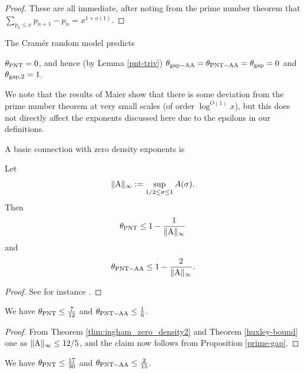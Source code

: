 \begin{proof} These are all immediate, after noting from the prime number theorem that $\sum_{p_n \leq x} p_{n+1} - p_n = x^{1+o(1)}$.
\end{proof}

The Cram\'er random model \cite{cramer} predicts

\begin{conjecture} $\theta_{\mathrm{PNT}} = 0$, and hence (by Lemma \ref{pnt-triv}) $\theta_{\mathrm{gap-AA}} = \theta_{\mathrm{PNT-AA}} = \theta_{\mathrm{gap}}=0$ and $\theta_{\mathrm{gap},2}=1$.
\end{conjecture}

We note that the results of Maier \cite{maier-primes} show that there is some deviation from the prime number theorem at very small scales (of order $\log^{O(1)} x$), but this does not directly affect the exponents discussed here due to the epsilons in our definitions.

A basic connection with zero density exponents is

\begin{proposition}\label{prime-gap}  Let
\begin{equation}\label{A-def}
    \|\mathrm{A}\|_\infty := \sup_{1/2 \leq \sigma \leq 1} A(\sigma).
\end{equation}
Then
    $$ \theta_{\mathrm{PNT}} \leq 1 - \frac{1}{\|\mathrm{A}\|_\infty}$$
    and
    $$ \theta_{\mathrm{PNT-AA}} \leq 1 - \frac{2}{\|\mathrm{A}\|_\infty}.$$
\end{proposition}

\begin{proof} See for instance \cite[\S 13.2]{guth-maynard}.
\end{proof}

\begin{corollary}  We have $\theta_{\mathrm{PNT}} \leq \frac{7}{12}$ and $\theta_{\mathrm{PNT-AA}} \leq \frac{1}{6}$.
\end{corollary}

\begin{proof}  From Theorem \ref{thm:ingham_zero_density2} and Theorem \ref{huxley-bound} one as $\|\mathrm{A}\|_\infty \leq 12/5$, and the claim now follows from Proposition \ref{prime-gap}.
\end{proof}

\begin{corollary}\cite{guth-maynard}  We have $\theta_{\mathrm{PNT}} \leq \frac{17}{30}$ and $\theta_{\mathrm{PNT-AA}} \leq \frac{2}{15}$.
\end{corollary}

